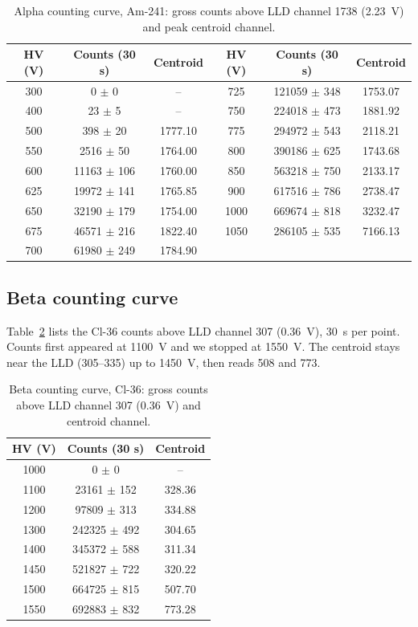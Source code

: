 \documentclass[12pt]{article}
\begin{document}
\begin{table}[!htbp]
\centering\small\setlength{\tabcolsep}{3pt}
\begin{tabular}{ccc|ccc}
\toprule
\textbf{HV (V)} & \textbf{Counts (30 s)} & \textbf{Centroid} & \textbf{HV (V)} & \textbf{Counts (30 s)} & \textbf{Centroid} \\
\midrule
300 & 0 $\pm$ 0 & -- & 725 & 121059 $\pm$ 348 & 1753.07 \\
400 & 23 $\pm$ 5 & -- & 750 & 224018 $\pm$ 473 & 1881.92 \\
500 & 398 $\pm$ 20 & 1777.10 & 775 & 294972 $\pm$ 543 & 2118.21 \\
550 & 2516 $\pm$ 50 & 1764.00 & 800 & 390186 $\pm$ 625 & 1743.68 \\
600 & 11163 $\pm$ 106 & 1760.00 & 850 & 563218 $\pm$ 750 & 2133.17 \\
625 & 19972 $\pm$ 141 & 1765.85 & 900 & 617516 $\pm$ 786 & 2738.47 \\
650 & 32190 $\pm$ 179 & 1754.00 & 1000 & 669674 $\pm$ 818 & 3232.47 \\
675 & 46571 $\pm$ 216 & 1822.40 & 1050 & 286105 $\pm$ 535 & 7166.13 \\
700 & 61980 $\pm$ 249 & 1784.90 & & & \\
\bottomrule
\end{tabular}
\caption{Alpha counting curve, Am-241: gross counts above LLD channel 1738 (2.23~V) and peak centroid channel.}
\label{tab:rawalpha}
\end{table}
 
\subsection{Beta counting curve}
 
Table~\ref{tab:rawbeta} lists the Cl-36 counts above LLD channel 307 (0.36~V), 30~s per point. Counts first appeared at 1100~V and we stopped at 1550~V. The centroid stays near the LLD (305--335) up to 1450~V, then reads 508 and 773.
 
\begin{table}[!htbp]
\centering\small
\begin{tabular}{ccc}
\toprule
\textbf{HV (V)} & \textbf{Counts (30 s)} & \textbf{Centroid} \\
\midrule
1000 & 0 $\pm$ 0 & -- \\
1100 & 23161 $\pm$ 152 & 328.36 \\
1200 & 97809 $\pm$ 313 & 334.88 \\
1300 & 242325 $\pm$ 492 & 304.65 \\
1400 & 345372 $\pm$ 588 & 311.34 \\
1450 & 521827 $\pm$ 722 & 320.22 \\
1500 & 664725 $\pm$ 815 & 507.70 \\
1550 & 692883 $\pm$ 832 & 773.28 \\
\bottomrule
\end{tabular}
\caption{Beta counting curve, Cl-36: gross counts above LLD channel 307 (0.36~V) and centroid channel.}
\label{tab:rawbeta}
\end{table}
 
\end{document}
